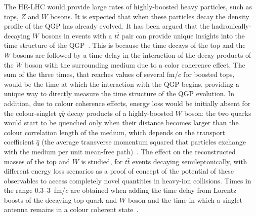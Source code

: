 \documentclass[../report.tex]{subfiles}
\begin{document}
The HE-LHC would provide large rates of highly-boosted heavy particles, such as tops, $Z$ and $W$ bosons. It is expected that when these particles decay the density profile of the QGP has already evolved. It has been argued that the hadronically-decaying $W$ bosons in events with a $t\bar t$ pair can provide unique insights into the time structure of the QGP~\cite{Apolinario:2017sob}. This is because the time decays of the top and the $W$ bosons are followed by a time-delay in the interaction of the decay products of the $W$ boson with the surrounding medium due to a color coherence effect. The sum of the three times, that reaches values of several fm/$c$ for boosted tops, would be the time at which the interaction with the QGP begins, providing a unique way to directly measure the time structure of the QGP evolution.
In addition, due to colour coherence effects, energy loss  would be initially absent for the colour-singlet $q\overline q$ decay products of a highly-boosted $W$ boson: the two quarks would start to be quenched only when their distance becomes larger than the colour correlation length of the medium, which depends on the transport coefficient $\hat{q}$ (the average transverse momentum squared that particles exchange with the medium per unit mean-free path)~\cite{CasalderreySolana:2012ef}.
The effect on the reconstructed masses of the top and $W$ is studied, for $t\bar t$ events decaying semileptonically, with different energy loss scenarios as a proof of concept of the potential of these observables to access completely novel quantities in heavy-ion collisions. Times in the range $0.3$--$3$~fm/$c$ are obtained when adding the time delay from Lorentz boosts of the decaying top quark and $W$ boson and the time in which a singlet antenna remains in a colour coherent state~\cite{Apolinario:2017sob}. 
\end{document}
